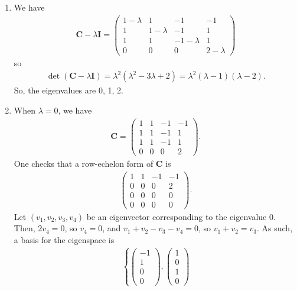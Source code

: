 \documentclass[12pt]{article}
\begin{document}
\begin{enumerate}[label=\textbf{(\alph*)}]
    \itemsep 0em
    \item We have \begin{align*}
        \mathbf{C}-\lambda\mathbf{I}=\begin{pmatrix}
            1-\lambda & 1 & -1 & -1 \\ 1 & 1-\lambda & -1 & 1 \\ 1 & 1 & -1-\lambda & 1 \\ 0 & 0 & 0 & 2-\lambda
        \end{pmatrix}
    \end{align*}
    so \begin{align*}
        \operatorname{det}\left(\mathbf{C}-\lambda\mathbf{I}\right)=\lambda^2\left(\lambda^2-3\lambda+2\right)=\lambda^2\left(\lambda-1\right)\left(\lambda-2\right).
    \end{align*}
    So, the eigenvalues are 0, 1, 2.
    \item When $\lambda=0$, we have \begin{align*}
        \mathbf{C}=\begin{pmatrix}
1 &  1 & -1 & -1 \\
1 &  1 & -1 &  1 \\
1 &  1 & -1 &  1 \\
0 &  0 &  0 &  2
\end{pmatrix}.
    \end{align*}
    One checks that a row-echelon form of $\mathbf{C}$ is \begin{align*}
        \begin{pmatrix}
            1 & 1 & -1 & -1 \\ 0 & 0 & 0 &2  \\ 0 & 0 & 0 & 0 \\ 0 & 0 & 0 & 0
        \end{pmatrix}.
    \end{align*}
    Let $\left(v_1,v_2,v_3,v_4\right)$ be an eigenvector corresponding to the eigenvalue 0. Then, $2v_4=0$, so $v_4=0$, and $v_1+v_2-v_3-v_4=0$, so $v_1+v_2=v_3$. As such, a basis for the eigenspace is \begin{align*}
        \left\{\begin{pmatrix}
            -1 \\ 1 \\ 0 \\ 0
        \end{pmatrix},\begin{pmatrix}
            1 \\ 0 \\ 1 \\ 0

\end{pmatrix}
\end{align*}
\end{enumerate}
\end{document}

